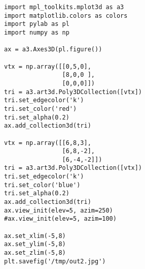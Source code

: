 


\begin{verbatim}
import mpl_toolkits.mplot3d as a3
import matplotlib.colors as colors
import pylab as pl
import numpy as np

ax = a3.Axes3D(pl.figure())

vtx = np.array([[0,5,0],
                [8,0,0 ],
                [0,0,0]])
tri = a3.art3d.Poly3DCollection([vtx])
tri.set_edgecolor('k')
tri.set_color('red')
tri.set_alpha(0.2)
ax.add_collection3d(tri)

vtx = np.array([[6,8,3],
                [6,8,-2],
                [6,-4,-2]])
tri = a3.art3d.Poly3DCollection([vtx])
tri.set_edgecolor('k')
tri.set_color('blue')
tri.set_alpha(0.2)
ax.add_collection3d(tri)
ax.view_init(elev=5, azim=250)
#ax.view_init(elev=5, azim=100)

ax.set_xlim(-5,8)
ax.set_ylim(-5,8)
ax.set_zlim(-5,8)
plt.savefig('/tmp/out2.jpg')
\end{verbatim}


















